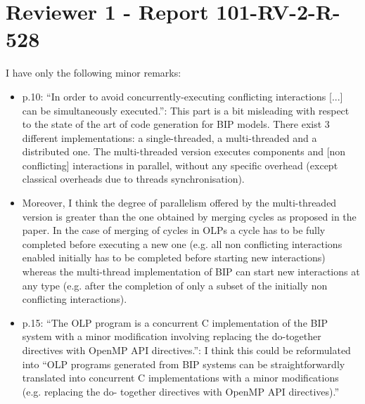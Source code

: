\section{Reviewer 1 - Report 101-RV-2-R-528}
I have only the following minor remarks:

\begin{itemize}
\item p.10: ``In order to avoid concurrently-executing conflicting interactions [...] can be simultaneously 
executed.'': This part is a bit misleading with respect to the state of the art of code generation for BIP 
models. There exist 3 different implementations: a single-threaded, a multi-threaded and a distributed 
one. The multi-threaded version executes components and [non conflicting] interactions in parallel, 
without any specific overhead (except classical overheads due to threads synchronisation).

\item Moreover, I think the degree of parallelism offered by the multi-threaded version is greater than the 
one obtained by merging cycles as proposed in the paper. In the case of merging of cycles in OLPs a 
cycle has to be fully completed before executing a new one (e.g. all non conflicting interactions 
enabled initially has to be completed before starting new interactions) whereas the multi-thread 
implementation of BIP can start new interactions at any type (e.g. after the completion of only a 
subset of the initially non conflicting interactions).

\item p.15: ``The OLP program is a concurrent C implementation of the BIP system with a minor 
modification involving replacing the do-together directives with OpenMP API directives.'': I think this 
could be reformulated into ``OLP programs generated from BIP systems can be straightforwardly 
translated into concurrent C implementations with a minor modifications (e.g. replacing the do-
together directives with OpenMP API directives).''
\end{itemize}
